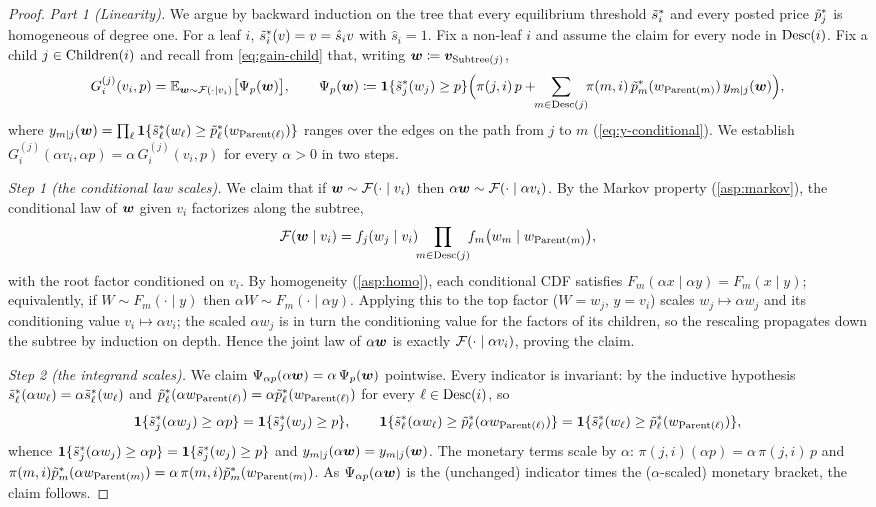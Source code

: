 \begin{proof}
\smallskip\noindent\textit{Part 1 (Linearity).}\enspace
We argue by backward induction on the tree that every equilibrium threshold $\tilde{s}^*_i$ and every posted price $\tilde{p}^*_j$ is homogeneous of degree one. For a leaf $i$, $\tilde{s}^*_i(v) = v = \hat{s}_i v$ with $\hat{s}_i = 1$. Fix a non-leaf $i$ and assume the claim for every node in $\operatorname{Desc}(i)$. Fix a child $j \in \operatorname{Children}(i)$ and recall from \cref{eq:gain-child} that, writing ${\bm{w}} \coloneqq {\bm{v}}_{\operatorname{Subtree}(j)}$,
\[
G^{(j)}_i(v_i, p) = \mathbb{E}_{{\bm{w}} \sim \mathcal{F}(\cdot \mid v_i)}\big[\Psi_p({\bm{w}})\big],
\qquad
\Psi_p({\bm{w}}) \coloneqq \bm{1}\{\tilde{s}^*_j(w_j) \ge p\}\Big(\pi(j,i)\,p + \!\!\sum_{m \in \operatorname{Desc}(j)}\!\! \pi(m,i)\, \tilde{p}^*_m(w_{\operatorname{Parent}(m)})\, y_{m \mid j}({\bm{w}})\Big),
\]
where $y_{m\mid j}({\bm{w}}) = \prod_{\ell}\bm{1}\{\tilde{s}^*_\ell(w_\ell) \ge \tilde{p}^*_\ell(w_{\operatorname{Parent}(\ell)})\}$ ranges over the edges on the path from $j$ to $m$ (\cref{eq:y-conditional}). We establish $G^{(j)}_i(\alpha v_i, \alpha p) = \alpha\, G^{(j)}_i(v_i, p)$ for every $\alpha > 0$ in two steps.

\emph{Step 1 (the conditional law scales).} We claim that if ${\bm{w}} \sim \mathcal{F}(\cdot \mid v_i)$ then $\alpha {\bm{w}} \sim \mathcal{F}(\cdot \mid \alpha v_i)$. By the Markov property (\cref{asp:markov}), the conditional law of ${\bm{w}}$ given $v_i$ factorizes along the subtree,
\[
\mathcal{F}({\bm{w}} \mid v_i) = f_j(w_j \mid v_i)\!\!\prod_{m \in \operatorname{Desc}(j)}\!\! f_m\big(w_m \mid w_{\operatorname{Parent}(m)}\big),
\]
with the root factor conditioned on $v_i$. By homogeneity (\cref{asp:homo}), each conditional CDF satisfies $F_m(\alpha x \mid \alpha y) = F_m(x \mid y)$; equivalently, if $W \sim F_m(\cdot \mid y)$ then $\alpha W \sim F_m(\cdot \mid \alpha y)$. Applying this to the top factor ($W = w_j$, $y = v_i$) scales $w_j \mapsto \alpha w_j$ and its conditioning value $v_i \mapsto \alpha v_i$; the scaled $\alpha w_j$ is in turn the conditioning value for the factors of its children, so the rescaling propagates down the subtree by induction on depth. Hence the joint law of $\alpha{\bm{w}}$ is exactly $\mathcal{F}(\cdot \mid \alpha v_i)$, proving the claim.

\emph{Step 2 (the integrand scales).} We claim $\Psi_{\alpha p}(\alpha {\bm{w}}) = \alpha\,\Psi_p({\bm{w}})$ pointwise. Every indicator is invariant: by the inductive hypothesis $\tilde{s}^*_\ell(\alpha w_\ell) = \alpha\tilde{s}^*_\ell(w_\ell)$ and $\tilde{p}^*_\ell(\alpha w_{\operatorname{Parent}(\ell)}) = \alpha\tilde{p}^*_\ell(w_{\operatorname{Parent}(\ell)})$ for every $\ell \in \operatorname{Desc}(i)$, so
\[
\bm{1}\{\tilde{s}^*_j(\alpha w_j) \ge \alpha p\} = \bm{1}\{\tilde{s}^*_j(w_j) \ge p\},
\qquad
\bm{1}\{\tilde{s}^*_\ell(\alpha w_\ell) \ge \tilde{p}^*_\ell(\alpha w_{\operatorname{Parent}(\ell)})\} = \bm{1}\{\tilde{s}^*_\ell(w_\ell) \ge \tilde{p}^*_\ell(w_{\operatorname{Parent}(\ell)})\},
\]
whence $\bm{1}\{\tilde{s}^*_j(\alpha w_j)\ge\alpha p\} = \bm{1}\{\tilde{s}^*_j(w_j)\ge p\}$ and $y_{m\mid j}(\alpha{\bm{w}}) = y_{m\mid j}({\bm{w}})$. The monetary terms scale by $\alpha$: $\pi(j,i)(\alpha p) = \alpha\,\pi(j,i)\,p$ and $\pi(m,i)\tilde{p}^*_m(\alpha w_{\operatorname{Parent}(m)}) = \alpha\,\pi(m,i)\tilde{p}^*_m(w_{\operatorname{Parent}(m)})$. As $\Psi_{\alpha p}(\alpha{\bm{w}})$ is the (unchanged) indicator times the ($\alpha$-scaled) monetary bracket, the claim follows.


\end{proof}
